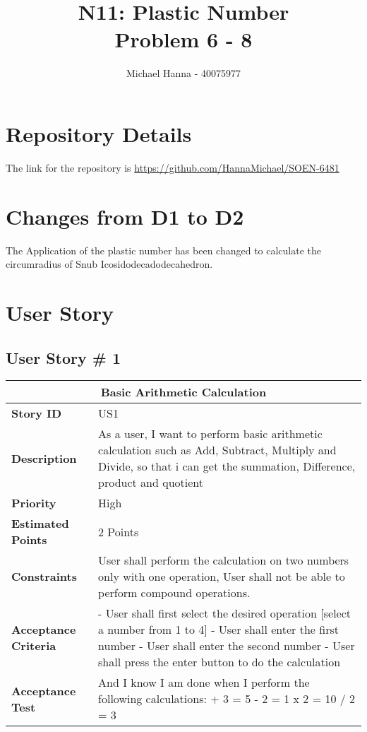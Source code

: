 \documentclass{report}
\title{N11: Plastic Number
\\ Problem 6 - 8}
\author{Michael Hanna - 40075977}
\date{}
\begin{document}
\maketitle
\tableofcontents
\listoftables
\chapter{Repository Details}
The link for the repository is  \newline \url{https://github.com/HannaMichael/SOEN-6481}
\chapter{Changes from D1 to D2}
The Application of the plastic number has been changed to calculate the circumradius of Snub Icosidodecadodecahedron.
\chapter{User Story}
\section{User Story \# 1}
\begin{tabular}{|p{3.5cm}|p{9cm}| }
\hline
\multicolumn{2}{|c|}{Basic Arithmetic Calculation}\\
\hline
\textbf {Story ID}& US1\\
\hline
\textbf{Description}& As a user, I want to perform basic arithmetic calculation such as Add, Subtract, Multiply and Divide, so that i can get the summation, Difference, product and quotient\\
\hline
\textbf{Priority} & High \\
\hline
\textbf{Estimated Points} & 2 Points\\
\hline
\textbf{Constraints}& User shall perform the calculation on two numbers only with one operation, User shall not be able to perform compound operations.\\
\hline
\textbf{Acceptance Criteria}&
 -  User shall first select the desired operation [select a number from 1 to 4]\newline
 -  User shall enter the first number\newline
 -  User shall enter the second number\newline
 -  User shall press the enter button to do the calculation\\
\hline
\textbf{Acceptance Test}&And I know I am done when I perform the following calculations: \newline  2 + 3 = 5 \newline  3 - 2 = 1 \newline 5 x 2 = 10 \newline 6 / 2 = 3\\
\hline
\end{tabular}
\end{document}
